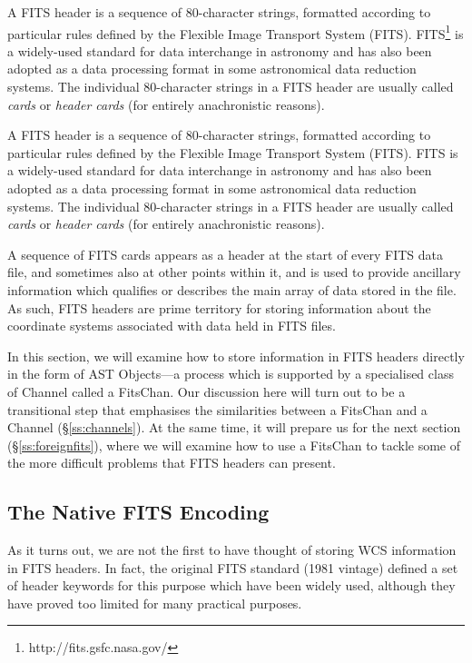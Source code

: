 \documentclass[twoside,11pt]{article}
\newcommand{\htmladdnormallink}[2]{#1}
\newenvironment{latexonly}{}{}
\newcommand{\secref}[1]{\S\ref{#1}}
\newcommand{\secref}[1]{\ref{#1}}
\begin{document}
\begin{latexonly}
A FITS header is a sequence of 80-character strings, formatted
according to particular rules defined by the Flexible Image Transport
System
(FITS). FITS\footnote{http://fits.gsfc.nasa.gov/}
is a widely-used standard for data interchange in astronomy and has
also been adopted as a data processing format in some astronomical
data reduction systems.  The individual 80-character strings in a FITS
header are usually called {\em{cards}} or {\em{header cards}} (for
entirely anachronistic reasons).
\end{latexonly}
\begin{htmlonly}
A FITS header is a sequence of 80-character strings, formatted
according to particular rules defined by the Flexible Image Transport
System (FITS).
\htmladdnormallink{FITS}{http://fits.gsfc.nasa.gov/}
is a widely-used standard for data interchange in astronomy and has
also been adopted as a data processing format in some astronomical
data reduction systems.  The individual 80-character strings in a FITS
header are usually called {\em{cards}} or {\em{header cards}} (for
entirely anachronistic reasons).
\end{htmlonly}

A sequence of FITS cards appears as a header at the start of every
FITS data file, and sometimes also at other points within it, and is
used to provide ancillary information which qualifies or describes the
main array of data stored in the file. As such, FITS headers are prime
territory for storing information about the coordinate systems
associated with data held in FITS files.

In this section, we will examine how to store information in FITS
headers directly in the form of AST Objects---a process which is
supported by a specialised class of Channel called a FitsChan. Our
discussion here will turn out to be a transitional step that
emphasises the similarities between a FitsChan and a Channel
(\secref{ss:channels}). At the same time, it will prepare us for the
next section (\secref{ss:foreignfits}), where we will examine how to
use a FitsChan to tackle some of the more difficult problems that FITS
headers can present.

\subsection{\label{ss:nativeencoding}The Native FITS Encoding}

As it turns out, we are not the first to have thought of storing WCS
information in FITS headers. In fact, the original FITS standard (1981
vintage) defined a set of header keywords for this purpose which have
been widely used, although they have proved too limited for many
practical purposes.
\end{document}
